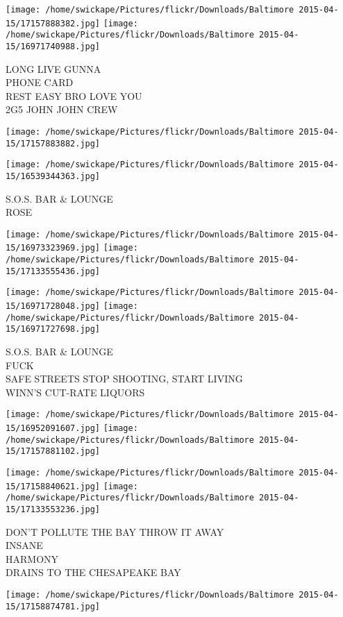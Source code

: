 \documentclass[10pt,letterpaper]{article}
\begin{document}
\texttt{[image: /home/swickape/Pictures/flickr/Downloads/Baltimore 2015-04-15/17157888382.jpg]}
\texttt{[image: /home/swickape/Pictures/flickr/Downloads/Baltimore 2015-04-15/16971740988.jpg]}

LONG LIVE GUNNA\\
PHONE CARD\\
REST EASY BRO LOVE YOU\\
2G5 JOHN JOHN CREW
\pagebreak

\texttt{[image: /home/swickape/Pictures/flickr/Downloads/Baltimore 2015-04-15/17157883882.jpg]}

\vspace{0.25in}
\texttt{[image: /home/swickape/Pictures/flickr/Downloads/Baltimore 2015-04-15/16539344363.jpg]}

S.O.S. BAR \& LOUNGE\\
ROSE
\pagebreak

\texttt{[image: /home/swickape/Pictures/flickr/Downloads/Baltimore 2015-04-15/16973323969.jpg]}
\texttt{[image: /home/swickape/Pictures/flickr/Downloads/Baltimore 2015-04-15/17133555436.jpg]}

\texttt{[image: /home/swickape/Pictures/flickr/Downloads/Baltimore 2015-04-15/16971728048.jpg]}
\texttt{[image: /home/swickape/Pictures/flickr/Downloads/Baltimore 2015-04-15/16971727698.jpg]}

S.O.S. BAR \& LOUNGE\\
FUCK\\
SAFE STREETS STOP SHOOTING, START LIVING\\
WINN'S CUT{-}RATE LIQUORS
\pagebreak

\texttt{[image: /home/swickape/Pictures/flickr/Downloads/Baltimore 2015-04-15/16952091607.jpg]}
\texttt{[image: /home/swickape/Pictures/flickr/Downloads/Baltimore 2015-04-15/17157881102.jpg]}

\texttt{[image: /home/swickape/Pictures/flickr/Downloads/Baltimore 2015-04-15/17158840621.jpg]}
\texttt{[image: /home/swickape/Pictures/flickr/Downloads/Baltimore 2015-04-15/17133553236.jpg]}

DON'T POLLUTE THE BAY THROW IT AWAY\\
INSANE\\
HARMONY\\
DRAINS TO THE CHESAPEAKE BAY
\pagebreak

\texttt{[image: /home/swickape/Pictures/flickr/Downloads/Baltimore 2015-04-15/17158874781.jpg]}
\end{document}
